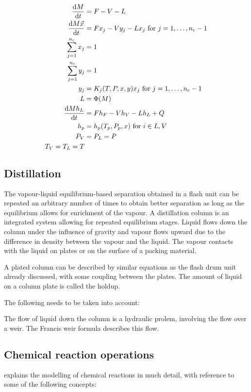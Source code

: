 \begin{align}
  \frac{\mathrm{d} M}{\mathrm{d} t}          & = F - V - L                                         \\
  \frac{\mathrm{d} M\vec{x}}{\mathrm{d} t}   & = Fx_j - Vy_j - Lx_j \text{ for } j = 1,\dots,n_c-1 \\
  \sum_{j=1}^{n_c} x_j & = 1                                                 \\
  \sum_{j=1}^{n_c} y_j & = 1                                                 \\
  y_j                  & = K_j(T, P, x, y)x_j \text{ for } j = 1,\dots,n_c-1 \\
  L                    & = \Phi(M)                                           \\
  \frac{\mathrm{d} Mh_L}{\mathrm{d} t}       & = Fh_F - Vh_V - Lh_L + Q                            \\
  h_p                  & = h_p(T_p, P_p, x) \text{ for } i \in {L, V}        \\
  P_V                  & = P_L = P                                           \\
  T_V=T_L=T
\end{align}

\subsection{Distillation}

The vapour-liquid equilibrium-based separation obtained in a flash unit can be
repeated an arbitrary number of times to obtain better separation as
long as the equilibrium allows for enrichment of the vapour.  A
distillation column is an integrated system allowing for repeated
equilibrium stages.  Liquid flows down the column under the influence
of gravity and vapour flows upward due to the difference in density
between the vapour and the liquid.  The vapour contacts with the
liquid on plates or on the surface of a packing material.  

A plated column can be described by similar equations as the flash
drum unit already discussed, with some coupling between the plates.
The amount of liquid on a column plate is called the holdup.

The following needs to be taken into account:



The flow of liquid down the column is a hydraulic prolem, involving
the flow over a weir.  The Francis weir formula describes this flow.


\subsection{Chemical reaction operations}
\citet[347]{cellier1991continuous} explains the modelling of chemical reactions in much detail, with reference to some of the following concepts:

